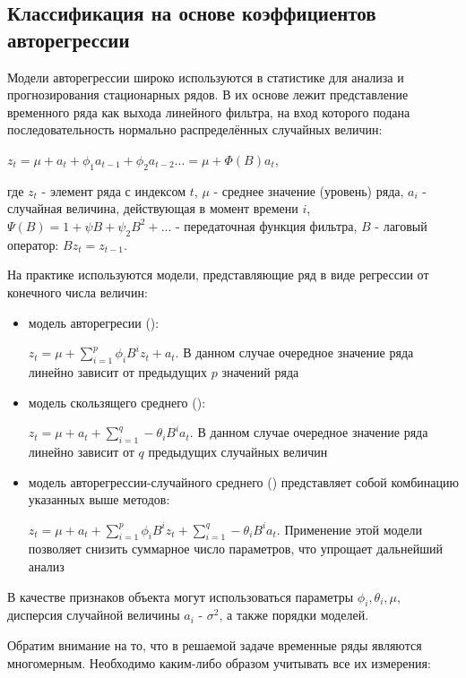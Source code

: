 \subsection{Классификация на основе коэффициентов авторегрессии}

Модели авторегрессии широко используются в статистике для анализа и прогнозирования стационарных рядов. В их основе лежит представление временного ряда как выхода линейного фильтра, на вход которого подана последовательность нормально распределённых случайных величин:

$z_t=\mu+a_t+\phi_1a_{t-1}+\phi_2a_{t-2}...=\mu+\Phi(B)a_t$, 

где $z_t$ - элемент ряда с индексом $t$, $\mu$ - среднее значение (уровень) ряда, $a_i$ - случайная величина, действующая в момент времени $i$, $\Psi(B)=1+\psi B+\psi_2 B^2+...$ - передаточная функция фильтра, $B$ - лаговый оператор: $Bz_t=z_{t-1}$.

На практике используются модели, представляющие ряд в виде регрессии от конечного числа величин\cite{bj_ts}: 

\begin{itemize}
\item модель авторегресии (): 

$z_t=\mu+\sum_{i=1}^p \phi_iB^i z_t + a_t$. В данном случае очередное значение ряда линейно зависит от предыдущих $p$ значений ряда
\item модель скользящего среднего ():

$z_t=\mu + a_t + \sum_{i=1}^q -\theta_iB^i a_t $. В данном случае очередное значение ряда линейно зависит от $q$ предыдущих случайных величин
\item модель авторегрессии-случайного среднего () представляет собой комбинацию указанных выше методов:

$z_t=\mu + a_t + \sum_{i=1}^p \phi_iB^i z_t + \sum_{i=1}^q -\theta_iB^i a_t $. Применение этой модели позволяет снизить суммарное число параметров, что упрощает дальнейший анализ
\end{itemize}

В качестве признаков объекта могут использоваться параметры $\phi_i, \theta_i, \mu$, дисперсия случайной величины $a_i$ - $\sigma^2$, а также порядки моделей.

Обратим внимание на то, что в решаемой задаче временные ряды являются многомерным. Необходимо каким-либо образом учитывать все их измерения:

